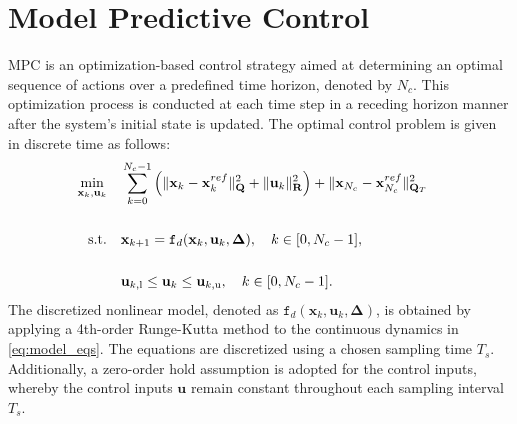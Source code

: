\section{Model Predictive Control}
\label{sec:mpc}






\ac{MPC} is an optimization-based control strategy aimed at determining an optimal sequence of actions over a predefined time horizon, denoted by $N_c$. This optimization process is conducted at each time step in a receding horizon manner after the system's initial state is updated. The optimal control problem is given in discrete time as follows:
%
{
\begin{subequations} 
\label{eq:NMPC}
\begin{align}
    \minimize_{\mathbf{x}_k,\mathbf{u}_k} \quad & \sum_{k = 0}^{N_c-1} \left( \|\mathbf{x}_k- \mathbf{x}^{ref}_k\|^2_{\mathbf{Q}}
    +  \|\mathbf{u}_k\|^2_{\mathbf{R}}\right) + 
    \nonumber
    \|\mathbf{x}_ {N_c}- \mathbf{x}^{ref}_{N_c}\|^2_{\mathbf{Q}_T} \nonumber \\
    & \label{eq:NMPC1} \\
    \text{s.t.} \quad & \mathbf{x}_{k+1} = \mathtt{f}_d(\mathbf{x}_k,\mathbf{u}_k, \mathbf{\Delta}) , \quad k \in [0, N_c-1],  \nonumber \\
    & \label{eq:NMPC2} \\
    & \mathbf{u}_{k,\textrm{l}} \leq \mathbf{u}_k \leq \mathbf{u}_{k,\textrm{u}}, \quad k \in [0, N_c-1].  & \label{eq:NMPC4} 
\end{align}
\end{subequations}
}
%
The discretized nonlinear model, denoted as $\mathtt{f}_d(\mathbf{x}_k, \mathbf{u}_k, \mathbf{\Delta})$, is obtained by applying a 4th-order Runge-Kutta method to the continuous dynamics in \eqref{eq:model_eqs}. The equations are discretized using a chosen sampling time $T_s$. Additionally, a zero-order hold assumption is adopted for the control inputs, whereby the control inputs $\mathbf{u}$ remain constant throughout each sampling interval $T_s$.

